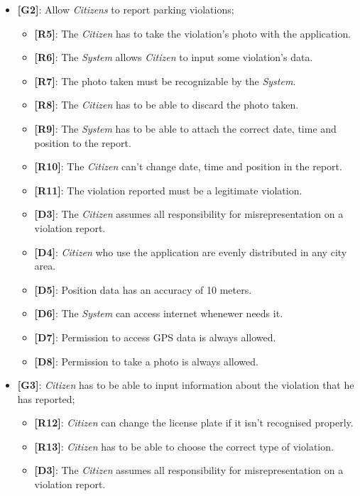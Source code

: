 \documentclass{article}
\begin{document}
\begin{itemize}
    \item \textbf{[G2]}: Allow \textit{Citizens} to report parking violations;
    \begin{itemize}
        \item \textbf{[R5]}: The \textit{Citizen} has to take the violation's photo with the application. 
        \item \textbf{[R6]}: The \textit{System} allows \textit{Citizen} to input some violation's data.
        \item \textbf{[R7]}: The photo taken must be recognizable by the \textit{System}.  
        \item \textbf{[R8]}: The \textit{Citizen} has to be able to discard the photo taken.
        \item \textbf{[R9]}: The \textit{System} has to be able to attach the correct date, time and position to the report.
        \item \textbf{[R10]}: The \textit{Citizen} can't change date, time and position in the report.
        \item \textbf{[R11]}: The violation reported must be a legitimate violation.
        \item \textbf{[D3]}: The \textit{Citizen} assumes all responsibility for misrepresentation on a violation report.
        \item \textbf{[D4]}: \textit{Citizen} who use the application are evenly distributed in any city area.
        \item \textbf{[D5]}: Position data has an accuracy of 10 meters.
        \item \textbf{[D6]}: The \textit{System} can access internet whenewer needs it.
        \item \textbf{[D7]}: Permission to access GPS data is always allowed.
        \item \textbf{[D8]}: Permission to take a photo is always allowed. 
    \end{itemize}

    \item \textbf{[G3]}: \textit{Citizen} has to be able to input information about the violation that he has reported;
    \begin{itemize}
        \item \textbf{[R12]}: \textit{Citizen} can change the license plate if it isn't recognised properly.
        \item \textbf{[R13]}: \textit{Citizen} has to be able to choose the correct type of violation.
        \item \textbf{[D3]}: The \textit{Citizen} assumes all responsibility for misrepresentation on a violation report.
    \end{itemize}


\end{itemize}
\end{document}
